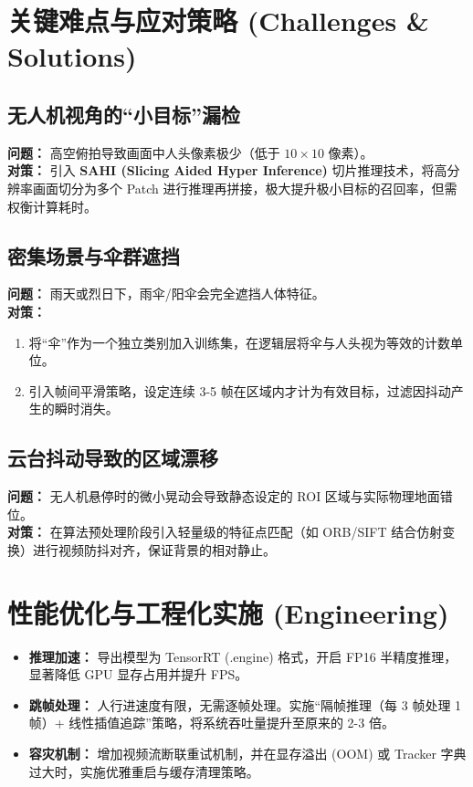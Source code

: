 \documentclass[a4paper, 11pt, fontset=fandol]{ctexart}
\begin{document}
\section{关键难点与应对策略 (Challenges \& Solutions)}

\subsection{无人机视角的“小目标”漏检}
\textbf{问题：} 高空俯拍导致画面中人头像素极少（低于 $10 \times 10$ 像素）。\\
\textbf{对策：} 引入 \textbf{SAHI (Slicing Aided Hyper Inference)} 切片推理技术，将高分辨率画面切分为多个 Patch 进行推理再拼接，极大提升极小目标的召回率，但需权衡计算耗时。

\subsection{密集场景与伞群遮挡}
\textbf{问题：} 雨天或烈日下，雨伞/阳伞会完全遮挡人体特征。\\
\textbf{对策：} 
\begin{enumerate}
    \item 将“伞”作为一个独立类别加入训练集，在逻辑层将伞与人头视为等效的计数单位。
    \item 引入帧间平滑策略，设定连续 3-5 帧在区域内才计为有效目标，过滤因抖动产生的瞬时消失。
\end{enumerate}

\subsection{云台抖动导致的区域漂移}
\textbf{问题：} 无人机悬停时的微小晃动会导致静态设定的 ROI 区域与实际物理地面错位。\\
\textbf{对策：} 在算法预处理阶段引入轻量级的特征点匹配（如 ORB/SIFT 结合仿射变换）进行视频防抖对齐，保证背景的相对静止。

\section{性能优化与工程化实施 (Engineering)}

\begin{itemize}
    \item \textbf{推理加速：} 导出模型为 TensorRT (.engine) 格式，开启 FP16 半精度推理，显著降低 GPU 显存占用并提升 FPS。
    \item \textbf{跳帧处理：} 人行进速度有限，无需逐帧处理。实施“隔帧推理（每 3 帧处理 1 帧）+ 线性插值追踪”策略，将系统吞吐量提升至原来的 2-3 倍。
    \item \textbf{容灾机制：} 增加视频流断联重试机制，并在显存溢出 (OOM) 或 Tracker 字典过大时，实施优雅重启与缓存清理策略。
\end{itemize}
\end{document}
